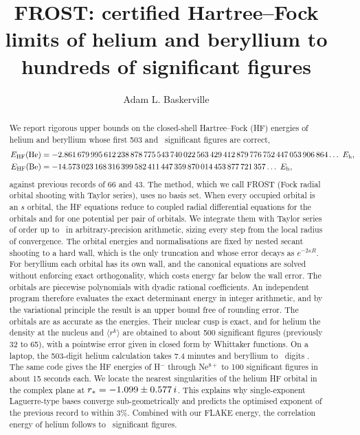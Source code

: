 \documentclass[aps,pra,reprint,superscriptaddress,amsmath,amssymb,longbibliography]{revtex4-2}
\newcommand{\eh}{E_\mathrm{h}}
\newcommand{\EHF}{E_\mathrm{HF}}
\begin{document}
\title{FROST: certified Hartree--Fock limits of helium and beryllium to hundreds of significant figures}

\author{Adam L. Baskerville}
\noaffiliation

\begin{abstract}
We report rigorous upper bounds on the closed-shell Hartree--Fock (HF) energies of helium and beryllium whose first 503 and \BeNsf\ significant figures are correct,
\begin{align*}
\EHF(\mathrm{He}) &= \EHFabs\ \eh ,\\
\EHF(\mathrm{Be}) &= \BeEabs\ \eh ,
\end{align*}
against previous records of 66 and 43. The method, which we call FROST (Fock radial orbital shooting with Taylor series), uses no basis set. When every occupied orbital is an $s$ orbital, the HF equations reduce to coupled radial differential equations for the orbitals and for one potential per pair of orbitals. We integrate them with Taylor series of order up to \MaxOrder\ in arbitrary-precision arithmetic, sizing every step from the local radius of convergence. The orbital energies and normalisations are fixed by nested secant shooting to a hard wall, which is the only truncation and whose error decays as $e^{-2\kappa R}$. For beryllium each orbital has its own wall, and the canonical equations are solved without enforcing exact orthogonality, which costs energy far below the wall error. The orbitals are piecewise polynomials with dyadic rational coefficients. An independent program therefore evaluates the exact determinant energy in integer arithmetic, and by the variational principle the result is an upper bound free of rounding error. The orbitals are as accurate as the energies. Their nuclear cusp is exact, and for helium the density at the nucleus and $\langle r^k\rangle$ are obtained to about 500 significant figures (previously 32 to 65), with a pointwise error given in closed form by Whittaker functions. On a laptop, the 503-digit helium calculation takes 7.4 minutes and beryllium to \BeD\ digits \BeTime. The same code gives the HF energies of H$^-$ through Ne$^{8+}$ to 100 significant figures in about 15 seconds each. We locate the nearest singularities of the helium HF orbital in the complex plane at $r_*=-1.099\pm0.577\,i$. This explains why single-exponent Laguerre-type bases converge sub-geometrically and predicts the optimised exponent of the previous record to within 3\%. Combined with our FLAKE energy, the correlation energy of helium follows to \Ncorr\ significant figures.
\end{abstract}
\end{document}
